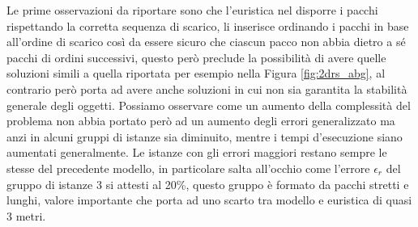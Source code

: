 Le prime osservazioni da riportare sono che l'euristica nel disporre i pacchi rispettando la corretta sequenza di scarico, li inserisce ordinando i pacchi in base all'ordine di scarico così da essere sicuro che ciascun pacco non abbia dietro a sé pacchi di ordini successivi, questo però preclude la possibilità di avere quelle soluzioni simili a quella riportata per esempio nella Figura \ref{fig:2drs_abg}, al contrario però porta ad avere anche soluzioni in cui non sia garantita la stabilità generale degli oggetti. Possiamo osservare come un aumento della complessità del problema non abbia portato però ad un aumento degli errori generalizzato ma anzi in alcuni gruppi di istanze sia diminuito, mentre i tempi d'esecuzione siano aumentati generalmente. Le istanze con gli errori maggiori restano sempre le stesse del precedente modello, in particolare salta all'occhio come l'errore $\epsilon_r$ del gruppo di istanze 3 si attesti al 20\%, questo gruppo è formato da pacchi stretti e lunghi, valore importante che porta ad uno scarto tra modello e euristica di quasi 3 metri.

\newpage
